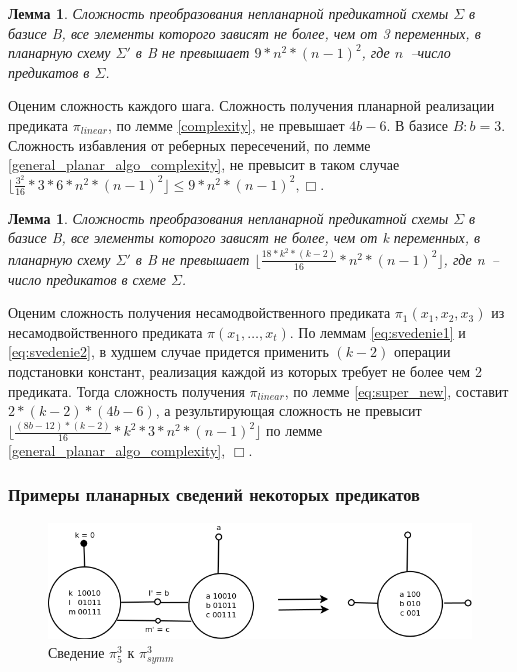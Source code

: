 \documentclass[12pt]{article}
\newtheorem{lemma}[theorem]{Лемма}
\newenvironment{proof}[1][Доказательство]{\begin{trivlist}
\item[\hskip \labelsep {\bfseries #1}]}{\end{trivlist}}
\begin{document}
\begin{lemma}
Сложность преобразования непланарной предикатной схемы $\Sigma$ в базисе B, 
все элементы которого зависят не более, чем от 3 переменных, 
в планарную схему $\Sigma'$ в B не превышает $9 * n^2 * (n-1)^2$, где $n$~--число предикатов в $\Sigma$.
\end{lemma}
\begin{proof}
Оценим сложность каждого шага. Сложность получения планарной реализации предиката $\pi_{linear}$, по лемме \ref{complexity},
не превышает $4b - 6$. В базисе $B: b=3$. Сложность избавления от реберных пересечений, по лемме \ref{general_planar_algo_complexity}, не 
превысит в таком случае $\lfloor \frac{3^2}{16} * 3 * 6 * n^2 * (n-1)^2 \rfloor \le 9 * n^2 * (n-1)^2, \Box$.
\end{proof}

\begin{lemma}
Сложность преобразования непланарной предикатной схемы $\Sigma$ в базисе B, 
все элементы которого зависят не более, чем от k переменных, 
в планарную схему $\Sigma'$ в B не превышает $\lfloor \frac{18 * k^2 * (k-2)}{16} * n^2 * (n-1)^2 \rfloor$, где n~-- число предикатов в схеме $\Sigma$.
\end{lemma}
\begin{proof}
Оценим сложность получения несамодвойственного предиката $\pi_1(x_1, x_2, x_3)$ из несамодвойственного предиката
$\pi(x_1, \dots, x_t)$. По леммам \ref{eq:svedenie1} и \ref{eq:svedenie2}, в худшем случае придется применить $(k-2)$ 
операции подстановки констант, реализация каждой из которых требует не более чем 2 предиката.
Тогда сложность получения $\pi_{linear}$, по лемме \ref{eq:super_new}, составит $2 * (k-2) * (4b - 6)$, а
результирующая сложность не превысит $\lfloor \frac{(8b - 12) * (k-2)}{16} * k^2 * 3 * n^2 * (n-1)^2 \rfloor $ по лемме 
\ref{general_planar_algo_complexity}, $\Box$.
\end{proof}

\clearpage
\subsubsection{Примеры планарных сведений некоторых предикатов}

\begin{figure}[htb]
\centering
\includegraphics[width=1.0\textwidth]{3_2to3.png}
\caption{Сведение $\pi_5^3$ к $\pi_{symm}^3$ }
\label{fig:3_2to3}
\end{figure}
\end{document}
